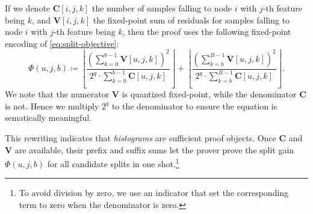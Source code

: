 If we denote $\mathbf{C}[i, j, k]$ the number of samples falling to node $i$ with $j$-th feature being $k$,
  and $\mathbf{V}[i, j, k]$ the fixed-point sum of residuals for samples falling to node $i$ with $j$-th feature being $k$,
  then the proof uses the following fixed-point encoding of \eqref{eq:split-objective}:
\begin{equation}
\Phi(u,j,b)
\coloneqq
\left\lfloor\frac{\left(\sum_{k=0}^{b-1} \mathbf{V}[u, j, k]\right)^2}{2^q\cdot\sum_{k=0}^{b-1} \mathbf{C}[u, j, k]}\right\rfloor
+
\left\lfloor\frac{\left(\sum_{k=b}^{B-1} \mathbf{V}[u, j, k]\right)^2}{2^q\cdot\sum_{k=b}^{B-1} \mathbf{C}[u, j, k]}\right\rfloor.
\end{equation}
We note that the numerator $\mathbf{V}$ is quantized fixed-point, while the denominator $\mathbf{C}$ is not.
Hence we multiply $2^q$ to the denominator to ensure the equation is sematically meaningful. 

This rewriting indicates that \emph{histograms} are sufficient proof objects. 
Once $\mathbf{C}$ and $\mathbf{V}$ are available, their prefix and suffix sums
let the prover prove the split gain $\Phi(u,j,b)$ for all candidate splits in one shot.\footnote{
  To avoid division by zero, we use an indicator
  that set the corresponding term to zero when the denominator is zero.
}

